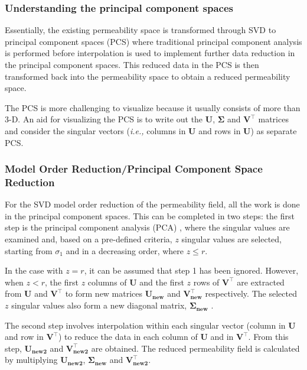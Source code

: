 \documentclass[preprint,12pt]{elsarticle}
\newcommand{\ie}{{\it i.e., }}
\begin{document}
\subsubsection{Understanding the principal component spaces}\label{subsubsection:visualization_pcspaces}
Essentially, the existing permeability space is transformed through SVD to principal component spaces (PCS) where traditional principal component analysis is performed before interpolation is used to implement further data reduction in the principal component spaces. This reduced data in the PCS is then transformed back into the permeability space to obtain a reduced permeability space.

The PCS is more challenging to visualize because it usually consists of more than 3-D. An aid for visualizing the PCS is to write out the $\mathbf{U}$, $\mathbf{\Sigma}$ and $\mathbf{V^{\intercal}}$ matrices and consider the singular vectors (\ie columns in $\mathbf{U}$ and rows in $\mathbf{U}$) as separate PCS.

\subsubsection{Model Order Reduction/Principal Component Space Reduction}\label{subsubsection:svdcase_preprocess_algorithm}
For the SVD model order reduction of the permeability field, all the work is done in the principal component spaces. This can be completed in two steps: the first step is the principal component analysis (PCA) \cite{Hotelling_1933}, where the singular values are examined and, based on a pre-defined criteria, $z$ singular values are selected, starting from $\sigma_{1}$ and in a decreasing order, where $z \leq r$.

In the case with $z = r$, it can be assumed that step 1 has been ignored. However, when $z < r$, the first $z$ columns of $\mathbf{U}$ and the first $z$ rows of $\mathbf{V^{\intercal}}$ are extracted from $\mathbf{U}$ and $\mathbf{V^{\intercal}}$ to form new matrices $\mathbf{U_{new}}$ and $\mathbf{V^{\intercal}_{new}}$ respectively. The selected $z$ singular values also form a new diagonal matrix, $\mathbf{\Sigma_{new}}$ .

The second step involves interpolation within each singular vector (column in $\mathbf{U}$ and row in $\mathbf{V^{\intercal}}$) to reduce the data in each column of  $\mathbf{U}$ and in $\mathbf{V^{\intercal}}$. From this step,  $\mathbf{U_{new2}}$ and $\mathbf{V^{\intercal}_{new2}}$ are obtained. The reduced permeability field is calculated by multiplying  $\mathbf{U_{new2}}$, $\mathbf{\Sigma_{new}}$ and $\mathbf{V^{\intercal}_{new2}}$. 
\end{document}
